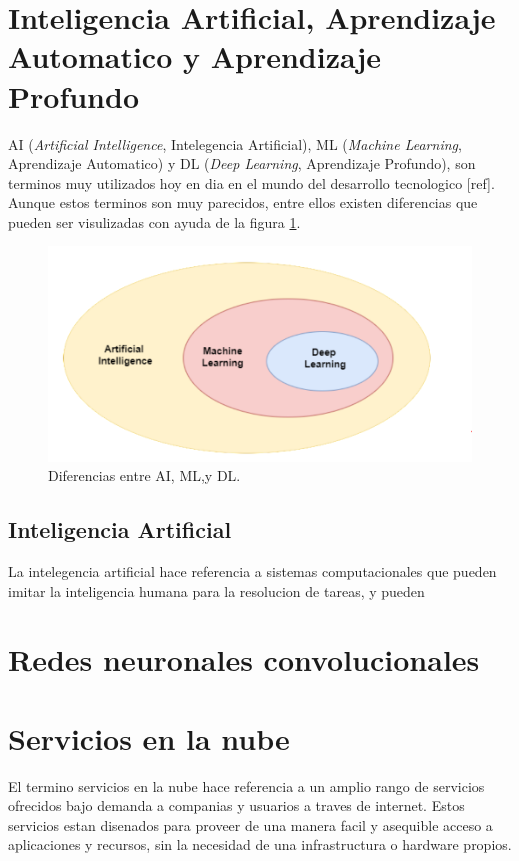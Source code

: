 \section{Inteligencia Artificial, Aprendizaje Automatico y Aprendizaje Profundo}

AI (\textit{Artificial Intelligence}, Intelegencia Artificial), ML (\textit{Machine Learning}, Aprendizaje Automatico) y DL (\textit{Deep Learning}, Aprendizaje Profundo), son terminos muy utilizados hoy en dia en el mundo del desarrollo tecnologico [ref]. Aunque estos terminos son muy parecidos, entre ellos existen diferencias que pueden ser visulizadas con ayuda de la figura \ref{fig:ai_ml_dl}.

\begin{figure}[h]
	\centering
	\includegraphics[scale=0.55]{./Figures/ai_ml_dl.png}
	\caption{Diferencias entre AI, ML,y DL.}
	\label{fig:ai_ml_dl}
\end{figure}

\subsection{Inteligencia Artificial}
La intelegencia artificial hace referencia a sistemas computacionales que pueden imitar la inteligencia humana para la resolucion de tareas, y pueden 

\section{Redes neuronales convolucionales}

\section{Servicios en la nube}
El termino servicios en la nube hace referencia a un amplio rango de servicios ofrecidos bajo demanda a companias y usuarios a traves de internet. Estos servicios estan disenados para proveer de una manera facil y asequible acceso a aplicaciones y recursos, sin la necesidad de una infrastructura o hardware propios.

